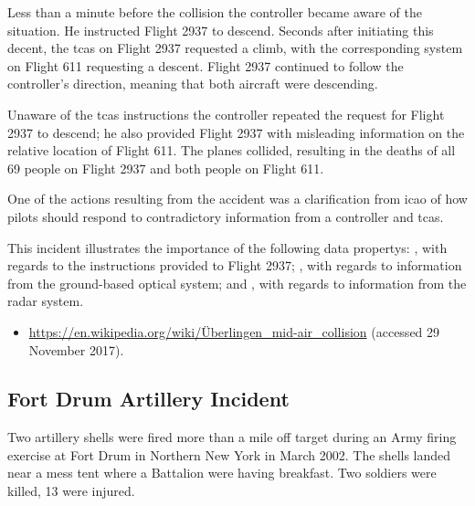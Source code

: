 Less than a minute before the collision the controller became aware of the situation. He instructed Flight 2937 to descend. Seconds after initiating this decent, the \gls{tcas} on Flight 2937 requested a climb, with the corresponding system on Flight 611 requesting a descent. Flight 2937 continued to follow the controller's direction, meaning that both aircraft were descending.

Unaware of the \gls{tcas} instructions the controller repeated the request for Flight 2937 to descend; he also provided Flight 2937 with misleading \gls{information} on the relative location of Flight 611. The planes collided, resulting in the deaths of all 69 people on Flight 2937 and both people on Flight 611.

One of the actions resulting from the accident was a clarification from \gls{icao} of how pilots should respond to contradictory \gls{information} from a controller and \gls{tcas}.

This incident illustrates the importance of the following \glspl{data property}: , with regards to the instructions provided to Flight 2937; , with regards to \gls{information} from the ground-based optical system; and , with regards to \gls{information} from the radar system.

\begin{samepage}
\begin{itemize}
	\item \raggedright{\href{https://en.wikipedia.org/wiki/\%C3\%9Cberlingen_mid-air_collision}{https://en.wikipedia.org/wiki/\"Uberlingen\_mid-air\_collision} (accessed 29 November 2017).}
\end{itemize}
\end{samepage}


\subsection{Fort Drum Artillery Incident} \label{bkm:incacc:fortdrum}
Two artillery shells were fired more than a mile off target during an Army firing exercise at Fort Drum in Northern New York in March 2002. The shells landed near a mess tent where a Battalion were having breakfast. Two soldiers were killed, 13 were injured. 

